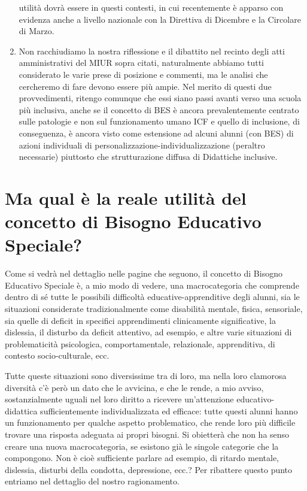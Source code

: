 \begin{enumerate}
	utilità dovrà essere in questi contesti, in cui recentemente è apparso con evidenza anche a livello
	nazionale con la Direttiva di Dicembre e la Circolare di Marzo.
	\item Non racchiudiamo la nostra riflessione e il dibattito nel recinto degli atti amministrativi del
	MIUR sopra citati, naturalmente abbiamo tutti considerato le varie prese di posizione e commenti,
	ma le analisi che cercheremo di fare devono essere più ampie. Nel merito di questi due
	provvedimenti, ritengo comunque che essi siano passi avanti verso una scuola più inclusiva, anche
	se il concetto di BES è ancora prevalentemente centrato sulle patologie e non sul funzionamento
	umano ICF e quello di inclusione, di conseguenza, è ancora visto come estensione ad alcuni alunni
	(con BES) di azioni individuali di personalizzazione-individualizzazione (peraltro necessarie)
	piuttosto che strutturazione diffusa di Didattiche inclusive.
\end{enumerate}
\section*{Ma qual è la reale utilità del concetto di Bisogno Educativo Speciale?}
Come si vedrà nel dettaglio nelle pagine che seguono, il concetto di Bisogno Educativo
Speciale è, a mio modo di vedere, una macrocategoria che comprende dentro di sé tutte le
possibili difficoltà educative-apprenditive degli alunni, sia le situazioni considerate
tradizionalmente come disabilità mentale, fisica, sensoriale, sia quelle di deficit in specifici
apprendimenti clinicamente significative, la dislessia, il disturbo da deficit attentivo, ad esempio, e
altre varie situazioni di problematicità psicologica, comportamentale, relazionale, apprenditiva, di
contesto socio-culturale, ecc.

Tutte queste situazioni sono diversissime tra di loro, ma nella loro clamorosa diversità c'è però
un dato che le avvicina, e che le rende, a mio avviso, sostanzialmente uguali nel loro diritto a
ricevere un'attenzione educativo-didattica sufficientemente individualizzata ed efficace: tutte
questi alunni hanno un funzionamento per qualche aspetto problematico, che rende loro più
difficile trovare una risposta adeguata ai propri bisogni.
Si obietterà che non ha senso creare una nuova macrocategoria, se esistono già le singole
categorie che la compongono. Non è cioè sufficiente parlare ad esempio, di ritardo mentale,
dislessia, disturbi della condotta, depressione, ecc.? Per ribattere questo punto entriamo nel
dettaglio del nostro ragionamento.
